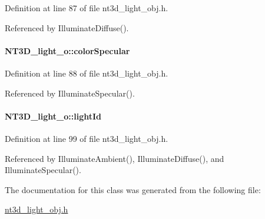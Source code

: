 Definition at line 87 of file nt3d\_\-light\_\-obj.h.



Referenced by IlluminateDiffuse().

\paragraph[{colorSpecular}]{ {\bf NT3D\_\-light\_\-o::colorSpecular}}\hfill\label{class_n_t3_d__light__o_a925f6392c85cd8d7938e331bc69aedb4}


Definition at line 88 of file nt3d\_\-light\_\-obj.h.



Referenced by IlluminateSpecular().

\paragraph[{lightId}]{ {\bf NT3D\_\-light\_\-o::lightId}}\hfill\label{class_n_t3_d__light__o_a908cd2700dcf23eb04f66e8c6b5c30e0}


Definition at line 99 of file nt3d\_\-light\_\-obj.h.



Referenced by IlluminateAmbient(), IlluminateDiffuse(), and IlluminateSpecular().



The documentation for this class was generated from the following file:\begin{DoxyCompactItemize}
\item 
\hyperlink{nt3d__light__obj_8h}{nt3d\_\-light\_\-obj.h}\end{DoxyCompactItemize}
